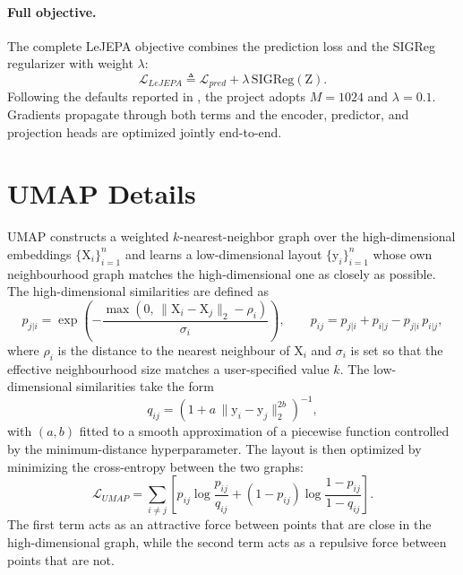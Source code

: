 \documentclass[11pt, a4paper]{article}
\begin{document}
\paragraph{Full objective.} The complete LeJEPA objective combines the prediction loss and the SIGReg regularizer with weight $\lambda$:
\begin{equation}
\mathcal{L}_{LeJEPA} \triangleq \mathcal{L}_{pred} + \lambda \, \mathrm{SIGReg}(\mathrm{Z}).
\end{equation}
Following the defaults reported in \parencite{balestriero-2025}, the project adopts $M = 1024$ and $\lambda = 0.1$. Gradients propagate through both terms and the encoder, predictor, and projection heads are optimized jointly end-to-end.

\section{UMAP Details} \label{app:b}

UMAP \parencite{mcinnes-2018} constructs a weighted $k$-nearest-neighbor graph over the high-dimensional embeddings $\{\mathrm{X}_i\}_{i=1}^{n}$ and learns a low-dimensional layout $\{\mathrm{y}_i\}_{i=1}^{n}$ whose own neighbourhood graph matches the high-dimensional one as closely as possible. The high-dimensional similarities are defined as
\begin{equation}
p_{j|i} = \exp\!\left(-\frac{\max(0,\, \lVert \mathrm{X}_i - \mathrm{X}_j \rVert_2 - \rho_i)}{\sigma_i}\right), \qquad p_{ij} = p_{j|i} + p_{i|j} - p_{j|i}\, p_{i|j},
\end{equation}
where $\rho_i$ is the distance to the nearest neighbour of $\mathrm{X}_i$ and $\sigma_i$ is set so that the effective neighbourhood size matches a user-specified value $k$. The low-dimensional similarities take the form
\begin{equation}
q_{ij} = \left(1 + a\,\lVert \mathrm{y}_i - \mathrm{y}_j \rVert_2^{2b}\right)^{-1},
\end{equation}
with $(a, b)$ fitted to a smooth approximation of a piecewise function controlled by the minimum-distance hyperparameter. The layout is then optimized by minimizing the cross-entropy between the two graphs:
\begin{equation}
\mathcal{L}_{UMAP} = \sum_{i \neq j} \left[ p_{ij} \log \frac{p_{ij}}{q_{ij}} + (1 - p_{ij}) \log \frac{1 - p_{ij}}{1 - q_{ij}} \right].
\end{equation}
The first term acts as an attractive force between points that are close in the high-dimensional graph, while the second term acts as a repulsive force between points that are not.
\end{document}
